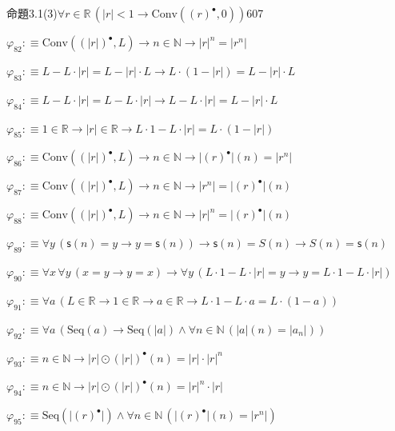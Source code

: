 \begin{fullproof}{命題3.1(3)}{$\forall r \in \mathbb{R}\,(\lvert r \rvert < 1 \to \mathrm{Conv}({(r)^{\bullet}},0))$}{607}
\begin{abbrevlist}
\item $\varphi_{82} :\equiv \mathrm{Conv}({(\lvert r \rvert)^{\bullet}},L) \to n \in \mathbb{N} \to {{\lvert r \rvert}^{n}} = \lvert {{r}^{n}} \rvert$
\item $\varphi_{83} :\equiv L - L \cdot \lvert r \rvert = L - \lvert r \rvert \cdot L \to L \cdot (1 - \lvert r \rvert) = L - \lvert r \rvert \cdot L$
\item $\varphi_{84} :\equiv L - L \cdot \lvert r \rvert = L - L \cdot \lvert r \rvert \to L - L \cdot \lvert r \rvert = L - \lvert r \rvert \cdot L$
\item $\varphi_{85} :\equiv 1 \in \mathbb{R} \to \lvert r \rvert \in \mathbb{R} \to L \cdot 1 - L \cdot \lvert r \rvert = L \cdot (1 - \lvert r \rvert)$
\item $\varphi_{86} :\equiv \mathrm{Conv}({(\lvert r \rvert)^{\bullet}},L) \to n \in \mathbb{N} \to \lvert {(r)^{\bullet}} \rvert(n) = \lvert {{r}^{n}} \rvert$
\item $\varphi_{87} :\equiv \mathrm{Conv}({(\lvert r \rvert)^{\bullet}},L) \to n \in \mathbb{N} \to \lvert {{r}^{n}} \rvert = \lvert {(r)^{\bullet}} \rvert(n)$
\item $\varphi_{88} :\equiv \mathrm{Conv}({(\lvert r \rvert)^{\bullet}},L) \to n \in \mathbb{N} \to {{\lvert r \rvert}^{n}} = \lvert {(r)^{\bullet}} \rvert(n)$
\item $\varphi_{89} :\equiv \forall y\,(\mathsf{s}(n) = y \to y = \mathsf{s}(n)) \to \mathsf{s}(n) = S(n) \to S(n) = \mathsf{s}(n)$
\item $\varphi_{90} :\equiv \forall x\,\forall y\,(x = y \to y = x) \to \forall y\,(L \cdot 1 - L \cdot \lvert r \rvert = y \to y = L \cdot 1 - L \cdot \lvert r \rvert)$
\item $\varphi_{91} :\equiv \forall a\,(L \in \mathbb{R} \to 1 \in \mathbb{R} \to a \in \mathbb{R} \to L \cdot 1 - L \cdot a = L \cdot (1 - a))$
\item $\varphi_{92} :\equiv \forall a\,(\mathrm{Seq}(a) \to \mathrm{Seq}(\lvert a \rvert) \land \forall n \in \mathbb{N}\,(\lvert a \rvert(n) = \lvert a_{n} \rvert))$
\item $\varphi_{93} :\equiv n \in \mathbb{N} \to \lvert r \rvert \odot {(\lvert r \rvert)^{\bullet}}(n) = \lvert r \rvert \cdot {{\lvert r \rvert}^{n}}$
\item $\varphi_{94} :\equiv n \in \mathbb{N} \to \lvert r \rvert \odot {(\lvert r \rvert)^{\bullet}}(n) = {{\lvert r \rvert}^{n}} \cdot \lvert r \rvert$
\item $\varphi_{95} :\equiv \mathrm{Seq}(\lvert {(r)^{\bullet}} \rvert) \land \forall n \in \mathbb{N}\,(\lvert {(r)^{\bullet}} \rvert(n) = \lvert {{r}^{n}} \rvert)$

\end{abbrevlist}
\end{fullproof}
